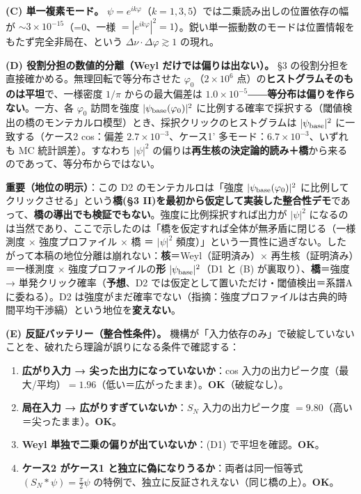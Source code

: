 \documentclass[
]{ltjsarticle}
\providecommand{\tightlist}{%
  \setlength{\itemsep}{0pt}\setlength{\parskip}{0pt}}
\begin{document}
\textbf{(C) 単一複素モード。}
\(\psi=e^{ik\varphi}\)（\(k=1,3,5\)）では二乗読み出しの位置依存の幅が
\(\sim3\times10^{-15}\)（=0、一様
\(=|e^{ik\varphi}|^2=1\)）。鋭い単一振動数のモードは位置情報をもたず完全非局在、という
\(\Delta\nu\cdot\Delta\varphi\gtrsim1\) の現れ。

\textbf{(D) 役割分担の数値的分離（Weyl だけでは偏りは出ない）。} §3
の役割分担を直接確かめる。無理回転で等分布させた
\(\varphi_0\)（\(2\times10^6\)
点）の\textbf{ヒストグラムそのものは平坦}で、一様密度 \(1/\pi\)
からの最大偏差は
\(1.0\times10^{-5}\)――\textbf{等分布は偏りを作らない}。一方、各
\(\varphi_0\) 訪問を強度 \(|\psi_{\rm base}(\varphi_0)|^2\)
に比例する確率で採択する（閾値検出の橋のモンテカルロ模型）とき、採択クリックのヒストグラムは
\(|\psi_{\rm base}|^2\) に一致する（ケース2 cos：偏差
\(2.7\times10^{-3}\)、ケース1' 多モード：\(6.7\times10^{-3}\)、いずれも
MC 統計誤差）。すなわち \(|\psi|^2\)
の偏りは\textbf{再生核の決定論的読み＋橋}から来るのであって、等分布からではない。

\textbf{重要（地位の明示）}：この D2 のモンテカルロは「強度
\(|\psi_{\rm base}(\varphi_0)|^2\)
に比例してクリックさせる」という\textbf{橋(§3
II)を最初から仮定して実装した整合性デモ}であって、\textbf{橋の導出でも検証でもない}。強度に比例採択すれば出力が
\(|\psi|^2\)
になるのは当然であり、ここで示したのは「橋を仮定すれば全体が無矛盾に閉じる（一様測度
× 強度プロファイル × 橋 ＝ \(|\psi|^2\)
頻度）」という一貫性に過ぎない。したがって本稿の地位分離は崩れない：\textbf{核}＝Weyl（証明済み）×
再生核（証明済み）＝一様測度 × 強度プロファイルの\textbf{形}
\(|\psi_{\rm base}|^2\)（D1 と (B) が裏取り）、\textbf{橋}＝強度 →
単発クリック確率（\textbf{予想}、D2
では仮定として置いただけ・閾値検出＝系譜A に委ねる）。D2
は強度がまだ確率でない（指摘：強度プロファイルは古典的時間平均干渉縞）という地位を\textbf{変えない}。

\textbf{(E) 反証バッテリー（整合性条件）。}
機構が「入力依存のみ」で破綻していないことを、破れたら理論が誤りになる条件で確認する：

\begin{enumerate}
\def\labelenumi{\arabic{enumi}.}
\tightlist
\item
  \textbf{広がり入力 → 尖った出力になっていないか}：cos
  入力の出力ピーク度（最大/平均）\(=1.96\)（低い＝広がったまま）。\textbf{OK}（破綻なし）。
\item
  \textbf{局在入力 → 広がりすぎていないか}：\(S_N\) 入力の出力ピーク度
  \(=9.80\)（高い＝尖ったまま）。\textbf{OK}。
\item
  \textbf{Weyl 単独で二乗の偏りが出ていないか}：(D1)
  で平坦を確認。\textbf{OK}。
\item
  \textbf{ケース2 がケース1 と独立に偽になりうるか}：両者は同一恒等式
  \((S_N*\psi)=\tfrac{\pi}{2}\psi\)
  の特例で、独立に反証されえない（同じ橋の上）。\textbf{OK}。
\end{enumerate}
\end{document}
